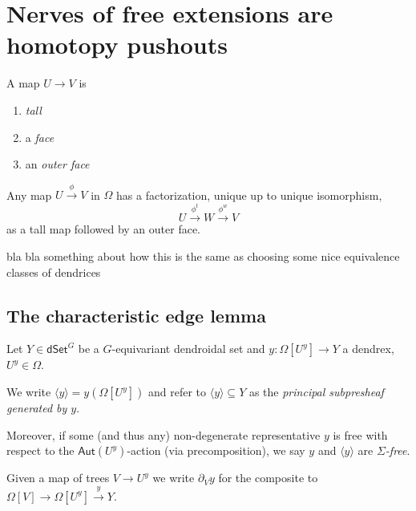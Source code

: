 \documentclass[a4paper,10pt
,draft
]{article}%
\renewcommand{\1}{\eta}%
\begin{document}
\newpage







\section{Nerves of free extensions are homotopy pushouts}

\begin{definition}
      A map $U \to V$ is
      \begin{enumerate}[label = (\roman*)]
      \item \textit{tall}
      \item a \textit{face}
      \item an \textit{outer face}
      \end{enumerate}
\end{definition}

\begin{proposition}
      \label{TALLOUTER_PROP}
      Any map $U \xrightarrow{\phi} V$ in $\Omega$ has a factorization, unique up to unique isomorphism,
      \[
            U \xrightarrow{\phi^t} W \xrightarrow{\phi^w} V
      \]
      as a tall map followed by an outer face.
\end{proposition}




{\color{red} bla bla something about how this is the same as choosing some nice equivalence classes of dendrices}

\subsection{The characteristic edge lemma}


\begin{notation}
Let $Y \in \mathsf{dSet}^G$ be a $G$-equivariant dendroidal set and 
$y \colon \Omega[U^y] \to Y$
a dendrex, $U^y \in \Omega$.

We write $\langle y \rangle = y\left(  \Omega[U^y] \right)$
and refer to
$\langle y \rangle \subseteq Y$
as the \emph{principal subpresheaf generated by $y$}.

Moreover, if some (and thus any)
non-degenerate representative $y$ is free 
with respect to the $\mathsf{Aut}(U^y)$-action (via precomposition),
we say $y$ and $\langle y \rangle$ are \emph{$\Sigma$-free}.

Given a map of trees $V \to U^y$ we write $\partial_V y$ for the composite to $\Omega[V] \to \Omega[U^y] \xrightarrow{y} Y$.
\end{notation}
\end{document}
